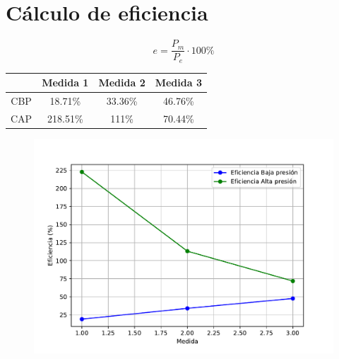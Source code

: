 \documentclass[a4paper,12pt]{report}
\begin{document}
\section{Cálculo de eficiencia}
$$
e = \frac{P_{m}}{P_{e}}\cdot 100\%
$$
\begin{center}
\begin{tabular}{|c|c|c|c|}
\hline 
 & Medida 1 & Medida 2 & Medida 3 \\ 
\hline 
CBP & 18.71\% & 33.36\% & 46.76\%\\ 
\hline 
CAP & 218.51\% & 111\% & 70.44\% \\ 
\hline
\end{tabular} 
\end{center}
\begin{figure}[H]
\centering
\includegraphics[scale=0.8]{eficiencia.pdf}
\end{figure}
\end{document}

